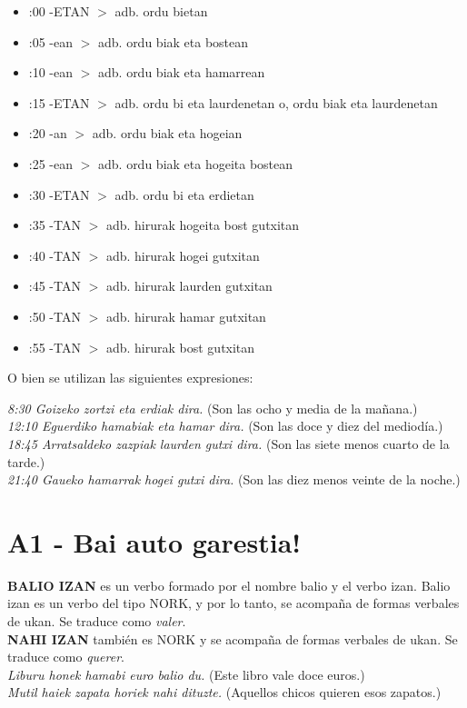 \documentclass[11pt, a4paper]{article}
\begin{document}
\begin{multicols}{2}
\begin{itemize}
\item :00 -ETAN $>$ adb. ordu bietan
\item :05 -ean $>$ adb. ordu biak eta bostean
\item :10 -ean $>$ adb. ordu biak eta hamarrean
\item :15 -ETAN $>$ adb. ordu bi eta laurdenetan o, 
\indent\indent\indent ordu biak eta laurdenetan
\item :20 -an $>$ adb. ordu biak eta hogeian
\item :25 -ean $>$ adb. ordu biak eta hogeita bostean
\item :30 -ETAN $>$ adb. ordu bi eta erdietan
\item :35 -TAN $>$ adb. hirurak hogeita bost gutxitan
\item :40 -TAN $>$ adb. hirurak hogei gutxitan
\item :45 -TAN $>$ adb. hirurak laurden gutxitan
\item :50 -TAN $>$ adb. hirurak hamar gutxitan
\item :55 -TAN $>$ adb. hirurak bost gutxitan
\end{itemize}
\end{multicols}

\noindent O bien se utilizan las siguientes expresiones:


\indent \textit{8:30 Goizeko zortzi eta erdiak dira.} (Son las ocho y media de la mañana.)\\
\indent \textit{12:10 Eguerdiko hamabiak eta hamar dira.} (Son las doce y diez del mediodía.)\\
\indent \textit{18:45 Arratsaldeko zazpiak laurden gutxi dira.} (Son las siete menos cuarto de la tarde.)\\
\indent \textit{21:40 Gaueko hamarrak hogei gutxi dira.} (Son las diez menos veinte de la noche.)\\

\section{A1 - Bai auto garestia!}
\noindent \textbf{BALIO IZAN} es un verbo formado por el nombre balio y el verbo izan. Balio izan es un verbo del tipo NORK, y por lo tanto, se acompaña de formas verbales de ukan. Se traduce como \textit{valer}.\\
\noindent \textbf{NAHI IZAN} también es NORK y se acompaña de formas verbales de ukan. Se traduce como \textit{querer}.\\
\indent \textit{Liburu honek hamabi euro balio du.} (Este libro vale doce euros.)\\
\indent \textit{Mutil haiek zapata horiek nahi dituzte. }(Aquellos chicos quieren esos zapatos.)\\
\end{document}
